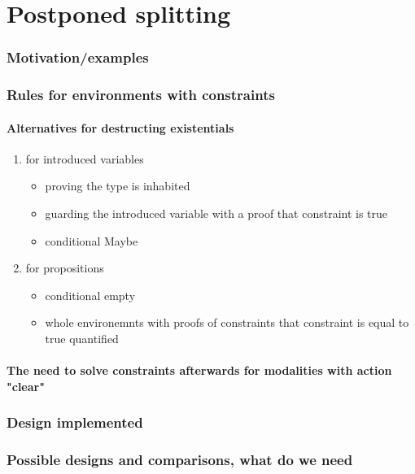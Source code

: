 \chapter{Postponed splitting}

\subsection{Motivation/examples}

\subsection{Rules for environments with constraints}

\subsubsection{Alternatives for destructing existentials}

\begin{enumerate}
\item for introduced variables

\begin{itemize}
\item proving the type is inhabited
\item guarding the introduced variable with a proof that constraint is true
\item conditional Maybe
\end{itemize}
\item for propositions

\begin{itemize}
\item conditional empty
\item whole environemnts with proofs of constraints that constraint is equal to true quantified
\end{itemize}
\end{enumerate}
\subsubsection{The need to solve constraints afterwards for modalities with action "clear"}

\subsection{Design implemented}

\subsection{Possible designs and comparisons, what do we need}


